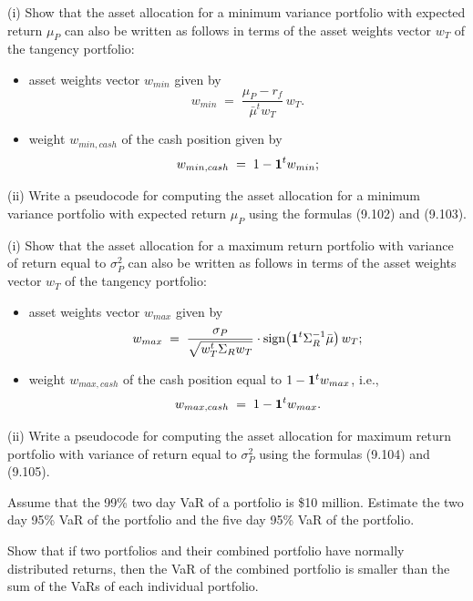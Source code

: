 \begin{exercises}
\item (i) Show that the asset allocation for a minimum variance portfolio
with expected return $\mu_P$ can also be written as follows in terms of the
asset weights vector $w_T$ of the tangency portfolio:
\begin{itemize}
\item asset weights vector $w_{min}$ given by
\begin{equation}
w_{min} \;=\; \frac{\mu_P - r_f}{\bar\mu^t w_T}\,w_T.
\end{equation}
\item weight $w_{min,cash}$ of the cash position given by
\begin{equation}
w_{min,cash} \;=\; 1 - \mathbf{1}^t w_{min};
\end{equation}
\end{itemize}
(ii) Write a pseudocode for computing the asset allocation for a minimum
variance portfolio with expected return $\mu_P$ using the formulas (9.102)
and (9.103).

\item (i) Show that the asset allocation for a maximum return portfolio with
variance of return equal to $\sigma_P^2$ can also be written as follows in
terms of the asset weights vector $w_T$ of the tangency portfolio:
\begin{itemize}
\item asset weights vector $w_{max}$ given by
\begin{equation}
w_{max} \;=\; \frac{\sigma_P}{\sqrt{w_T^t\Sigma_R w_T}}\cdot\operatorname{sign}\bigl(\mathbf{1}^t\Sigma_R^{-1}\bar\mu\bigr)\,w_T;
\end{equation}
\item weight $w_{max,cash}$ of the cash position equal to $1-\mathbf{1}^t
w_{max}$, i.e.,
\begin{equation}
w_{max,cash} \;=\; 1-\mathbf{1}^t w_{max}.
\end{equation}
\end{itemize}
(ii) Write a pseudocode for computing the asset allocation for maximum
return portfolio with variance of return equal to $\sigma_P^2$ using the
formulas (9.104) and (9.105).

\item Assume that the 99\% two day VaR of a portfolio is \$10 million.
Estimate the two day 95\% VaR of the portfolio and the five day 95\% VaR of
the portfolio.

\item Show that if two portfolios and their combined portfolio have normally
distributed returns, then the VaR of the combined portfolio is smaller than
the sum of the VaRs of each individual portfolio.


\end{exercises}
